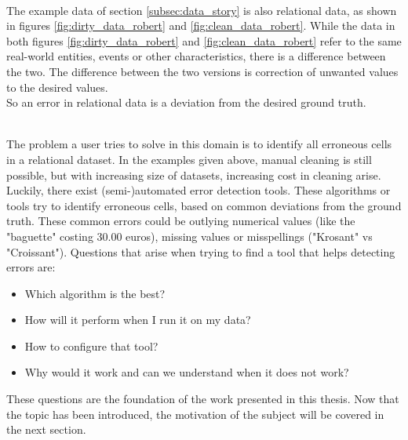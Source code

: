 ~\\The example data of section \ref{subsec:data_story} is also relational data, as shown in figures \ref{fig:dirty_data_robert} and \ref{fig:clean_data_robert}. While the data in both figures \ref{fig:dirty_data_robert} and \ref{fig:clean_data_robert} refer to the same real-world entities, events or other characteristics, there is a difference between the two. The difference between the two versions is correction of unwanted values to the desired values. 
~\\So an error in relational data is a deviation from the desired ground truth.

~\\The problem a user tries to solve in this domain is to identify all erroneous cells in a relational dataset. In the examples given above, manual cleaning is still possible, but with increasing size of datasets, increasing cost in cleaning arise. Luckily, there exist (semi-)automated error detection tools. These algorithms or tools try to identify erroneous cells, based on common deviations from the ground truth. These common errors could be outlying numerical values (like the "baguette" costing 30.00 euros), missing values or misspellings ("Krosant" vs "Croissant"). Questions that arise when trying to find a tool that helps detecting errors are:

\begin{itemize}
    \item Which algorithm is the best?
    \item How will it perform when I run it on my data?
    \item How to configure that tool?
    \item Why would it work and can we understand when it does not work?
\end{itemize}

These questions are the foundation of the work presented in this thesis. Now that the topic has been introduced, the motivation of the subject will be covered in the next section.